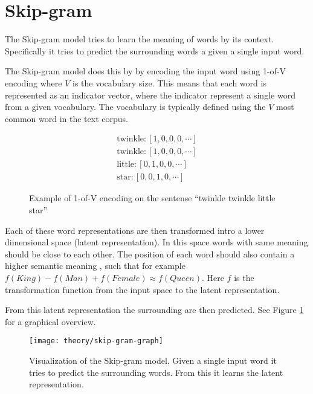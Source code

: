 
\section{Skip-gram}

The Skip-gram model tries to learn the meaning of words by its context. Specifically it tries to predict the surrounding words a given a single input word.

The Skip-gram model does this by by encoding the input word using 1-of-V encoding where $V$ is the vocabulary size. This means that each word is represented as an indicator vector, where the indicator represent a single word from a given vocabulary. The vocabulary is typically defined using the $V$ most common word in the text corpus. 
\begin{figure}[H]
\begin{equation*}
\begin{aligned}
\text{twinkle}: \left[1, 0, 0, 0, \cdots \right] \\
\text{twinkle}: \left[1, 0, 0, 0, \cdots \right] \\
\text{little}: \left[0, 1, 0, 0, \cdots \right] \\
\text{star}: \left[0, 0, 1, 0, \cdots \right]
\end{aligned}
\end{equation*}
\caption{Example of 1-of-V encoding on the sentense ``twinkle twinkle little star''}
\end{figure}

Each of these word representations are then transformed intro a lower dimensional space (latent representation). In this space words with same meaning should be close to each other. The position of each word should also contain a higher semantic meaning , such that for example $f(King) - f(Man) + f(Female) \approx f(Queen)$. Here $f$ is the transformation function from the input space to the latent representation.

From this latent representation the surrounding are then predicted. See Figure \ref{fig:theory:skip-gram:graph} for a graphical overview.

\begin{figure}[h]
	\centering
	\texttt{[image: theory/skip-gram-graph]}
	\caption{Visualization of the Skip-gram model. Given a single input word it tries to predict the surrounding words. From this it learns the latent representation.}
	\label{fig:theory:skip-gram:graph}
\end{figure}

